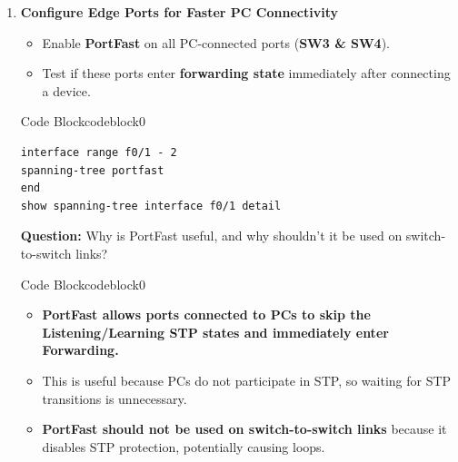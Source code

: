 \documentclass[a4paper]{book}
\begin{document}
\begin{enumerate}


	      \begin{ocg}{Code Block}{codeblock}{0}
		      \vspace{0.5cm}
		      \begin{lstlisting}
conf t
spanning-tree vlan 1 priority 4096
end
show spanning-tree vlan 1
          \end{lstlisting}
	      \end{ocg}


	\item \textbf{Configure Edge Ports for Faster PC Connectivity}
	      \begin{itemize}
		      \item Enable \textbf{PortFast} on all PC-connected ports (\textbf{SW3 \& SW4}).
		      \item Test if these ports enter \textbf{forwarding state} immediately after connecting a device.
	      \end{itemize}



	      \begin{ocg}{Code Block}{codeblock}{0}
		      \vspace{0.5cm}
		      \begin{lstlisting}
interface range f0/1 - 2
spanning-tree portfast
end
show spanning-tree interface f0/1 detail
 \end{lstlisting}
	      \end{ocg}

	      \textbf{Question:} Why is PortFast useful, and why shouldn’t it be used on switch-to-switch links?



	      \begin{ocg}{Code Block}{codeblock}{0}
		      \vspace{0.5cm}
		      \begin{itemize}
			      \item \textbf{PortFast allows ports connected to PCs to skip the Listening/Learning STP states and immediately enter Forwarding.}
			      \item This is useful because PCs do not participate in STP, so waiting for STP transitions is unnecessary.
			      \item \textbf{PortFast should not be used on switch-to-switch links} because it disables STP protection, potentially causing loops.
		      \end{itemize}
	      \end{ocg}


\end{enumerate}
\end{document}
